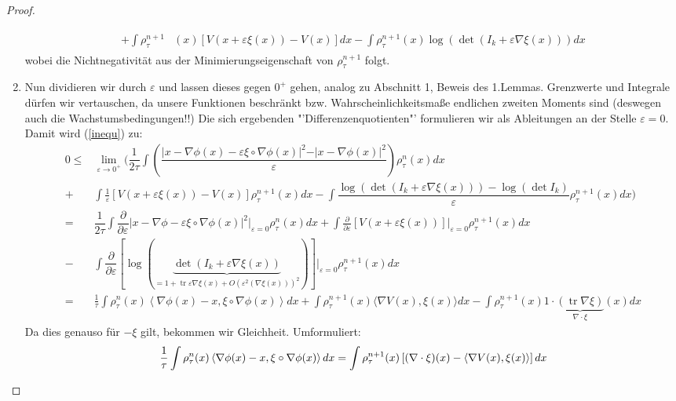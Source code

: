\documentclass[11pt,a4paper,notitlepage]{scrreprt}
\begin{document}
\begin{proof}
\begin{enumerate}
\begin{align}
\begin{split}
+\int\rho_\tau^{n+1}&(x)[V(x+\varepsilon\xi(x))-V(x)]dx-\int\rho_\tau^{n+1}(x)\log( \det(I_k+\varepsilon\nabla\xi(x)))dx \label{inequ}
\end{split}
\end{align}
wobei die Nichtnegativität aus der Minimierungseigenschaft von $\rho_\tau^{n+1}$ folgt.\\
\item Nun dividieren wir durch $\varepsilon$ und lassen dieses gegen $0^+$ gehen, analog zu Abschnitt 1, Beweis des 1.Lemmas. Grenzwerte und Integrale dürfen wir vertauschen, da unsere Funktionen beschränkt bzw. Wahrscheinlichkeitsmaße endlichen zweiten Moments sind (deswegen auch die Wachstumsbedingungen!!) Die sich ergebenden "'Differenzenquotienten"' formulieren wir als Ableitungen an der Stelle $\varepsilon=0$. Damit wird (\ref{inequ}) zu: 
\begin{align*}
0\leq& \lim_{\varepsilon\to 0^+} \Bigg(\dfrac{1}{2\tau} \int\left(\dfrac{\vert x-\nabla \phi(x)-\varepsilon\xi\circ\nabla\phi(x)\vert^2-\vert x-\nabla\phi(x)\vert^2}{\varepsilon}\right)\rho_\tau^n(x)dx\\
+&\int\frac{1}{\varepsilon}[V(x+\varepsilon\xi(x))-V(x)]\rho_\tau^{n+1}(x)dx-\int\dfrac{\log( \det(I_k+\varepsilon\nabla\xi(x)))-\log(\det I_k)}{\varepsilon}\rho_\tau^{n+1}(x)dx \Bigg)\\
=& \dfrac{1}{2\tau} \int \dfrac{\partial}{\partial\varepsilon}\vert x-\nabla\phi-\varepsilon\xi\circ\nabla\phi(x)\vert^2\Big|_{\varepsilon=0} \rho_\tau^n(x)dx
+\int\frac{\partial}{\partial\varepsilon}[V(x+\varepsilon\xi(x))]\Big|_{\varepsilon=0}\rho_\tau^{n+1}(x)dx\\-&\int\dfrac{\partial}{\partial\varepsilon}[\log(\underset{=1+\operatorname{tr}\varepsilon\nabla\xi(x)+O(\varepsilon^2(\nabla\xi(x)))^2}{\underbrace{\det(I_k+\varepsilon\nabla\xi(x))}})]\Big|_{\varepsilon=0} \rho_\tau^{n+1}(x)dx \\
=&\frac{1}{\tau} \int \rho_\tau^n(x)\left\langle\nabla\phi(x)-x,\xi\circ\nabla\phi(x)\right\rangle dx+\int\rho_\tau^{n+1}(x)\langle\nabla V(x),\xi(x)\rangle dx-\int\rho_\tau^{n+1}(x)1\cdot\underset{\nabla\cdot\xi}{\underbrace{(\operatorname{tr}\nabla\xi)}}(x)dx
\end{align*}
Da dies genauso für $-\xi$ gilt, bekommen wir Gleichheit. Umformuliert:
\begin{equation}
\frac{1}{\tau} \int \rho_\tau^n(x)\left\langle\nabla\phi(x)-x,\xi\circ\nabla\phi(x)\right\rangle dx\\=\int\rho_\tau^{n+1}(x)\left[(\nabla\cdot \xi)(x)-\langle\nabla V(x),\xi(x)\rangle \right]dx \label{eqwithxi}

\end{equation}
\end{enumerate}
\end{proof}
\end{document}
